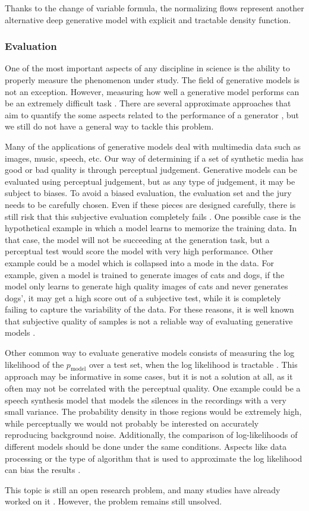 Thanks to the change of variable formula, the normalizing flows represent another alternative deep generative model with explicit and tractable density function.

\subsubsection{Evaluation} \label{sec:dgmevaluation}
One of the most important aspects of any discipline in science is the ability to properly measure the phenomenon under study. The field of generative models is not an exception. However, measuring how well a generative model performs can be an extremely difficult task \autocite{Goodfellow2016}. There are several approximate approaches that aim to quantify the some aspects related to the performance of a generator \autocite{theis2016a}, but we still do not have a general way to tackle this problem.

Many of the applications of generative models deal with multimedia data such as images, music, speech, etc. Our way of determining if a set of synthetic media has good or bad quality is through perceptual judgement. Generative models can be evaluated using perceptual judgement, but as any type of judgement, it may be subject to biases. To avoid a biased evaluation, the evaluation set and the jury needs to be carefully chosen. Even if these pieces are designed carefully, there is still risk that this subjective evaluation completely fails \autocite{Goodfellow2016}. One possible case is the hypothetical example in which a model learns to memorize the training data. In that case, the model will not be succeeding at the generation task, but a perceptual test would score the model with very high performance. Other example could be a model which is collapsed into a mode in the data. For example, given a model is trained to generate images of cats and dogs, if the model only learns to generate high quality images of cats and never generates dogs', it may get a high score out of a subjective test, while it is completely failing to capture the variability of the data. For these reasons, it is well known that subjective quality of samples is not a reliable way of evaluating generative models \autocite{denton2015}.

Other common way to evaluate generative models consists of measuring the log likelihood of the $p_\mathrm{model}$ over a test set, when the log likelihood is tractable \autocite{Goodfellow2016}. This approach may be informative in some cases, but it is not a solution at all, as it often may not be correlated with the perceptual quality. One example could be a speech synthesis model that models the silences in the recordings with a very small variance. The probability density in those regions would be extremely high, while perceptually we would not probably be interested on accurately reproducing background noise. Additionally, the comparison of log-likelihoods of different models should be done under the same conditions. Aspects like data processing or the type of algorithm that is used to approximate the log likelihood can bias the results \autocite{Goodfellow2016}.

This topic is still an open research problem, and many studies have already worked on it \autocite{theis2016a, sajjadi2018}. However, the problem remains still unsolved.



